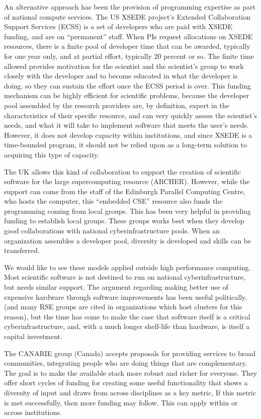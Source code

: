 An alternative approach has been the provision of programming expertise as part
of national compute services. The US XSEDE project's Extended Collaboration Support 
Services (ECSS) is a set of developers who are paid with XSEDE funding, and are
on ``permanent'' staff. When PIs request allocations on XSEDE resources, there
is a finite pool of developer time that can be awarded, typically for one year
only, and at partial effort, typically 20 percent or so. The finite time allowed
provides motivation for the scientist and the scientist's group to work closely with the
developer and to become educated in what the developer is doing, so they can
sustain the effort once the ECSS period is over. This funding mechanism can be
highly efficient for scientific problems, because the developer pool assembled
by the research providers are, by definition, expert in the characteristics of
their specific resource, and can very quickly assess the scientist's needs, and
what it will take to implement software that meets the user's needs. However, it
does not develop capacity within institutions, and since XSEDE is a time-bounded
program, it should not be relied upon as a long-term solution to acquiring this
type of capacity.

The UK allows this kind of collaboration to support the creation of scientific
software for the large supercomputing resource (ARCHER). However, while the
support can come from the staff of the Edinburgh Parallel Computing Centre,
who hosts the computer, this ``embedded CSE'' resource also funds the
programming coming from local groups. This has been very helpful in providing
funding to establish local groups. These groups works best when they develop good
collaborations with national cyberinfrastructure pools. When an organization
assembles a developer pool, diversity is developed and skills can be
transferred.

We would like to see these models applied outside high performance computing.
Most scientific software is not destined to run on national cyberinfrastructure,
but needs similar support. The argument regarding making better use of expensive
hardware through software improvements has been useful politically, (and many
RSE groups are cited in organizations which host clusters for this reason), but
the time has come to make the case that software itself is a critical
cyberinfrastructure, and, with a much longer shelf-life than hardware, is itself
a capital investment.

The CANARIE group (Canada) accepts proposals for providing services to broad
communities, integrating people who are doing things that are complementary. The
goal is to make the available stack more robust and richer for everyone. They
offer short cycles of funding for creating some useful
functionality that shows a diversity of input and draws from across disciplines as a key metric,  If this metric is met successfully, 
then more funding may follow. This can apply within or across institutions.

